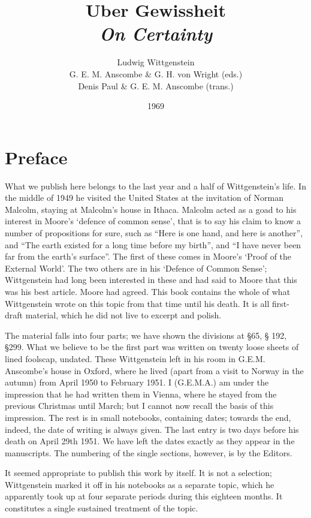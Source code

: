 \documentclass{book}
\title{Uber Gewissheit \\ \emph{On Certainty}}
\author{Ludwig Wittgenstein \vspace{12pt} \\ G. E. M. Anscombe \& G. H. von Wright (eds.) \\ Denis Paul \& G. E. M. Anscombe (trans.)}
\date{1969}
\begin{document}
\frontmatter
\maketitle

\chapter{Preface}

What we publish here belongs to the last year and a half of Wittgenstein's
life. In the middle of 1949 he visited the United States at the invitation of
Norman Malcolm, staying at Malcolm's house in Ithaca. Malcolm acted as a goad
to his interest in Moore's `defence of common sense', that is to say his claim
to know a number of propositions for sure, such as ``Here is one hand, and here
is another'', and ``The earth existed for a long time before my birth'', and
``I have never been far from the earth's surface''. The first of these comes in
Moore's `Proof of the External World'. The two others are in his `Defence of
Common Sense'; Wittgenstein had long been interested in these and had said to
Moore that this was his best article. Moore had agreed. This book contains the
whole of what Wittgenstein wrote on this topic from that time until his death.
It is all first-draft material, which he did not live to excerpt and polish.

The material falls into four parts; we have shown the divisions at \S 65, \S
192, \S 299. What we believe to be the first part was written on twenty loose
sheets of lined foolscap, undated. These Wittgenstein left in his room in
G.E.M. Anscombe's house in Oxford, where he lived (apart from a visit to Norway
in the autumn) from April 1950 to February 1951. I (G.E.M.A.) am under the
impression that he had written them in Vienna, where he stayed from the
previous Christmas until March; but I cannot now recall the basis of this
impression. The rest is in small notebooks, containing dates; towards the end,
indeed, the date of writing is always given. The last entry is two days before
his death on April 29th 1951. We have left the dates exactly as they appear in
the manuscripts. The numbering of the single sections, however, is by the
Editors.

It seemed appropriate to publish this work by itself. It is not a selection;
Wittgenstein marked it off in his notebooks as a separate topic, which he
apparently took up at four separate periods during this eighteen months. It
constitutes a single sustained treatment of the topic.
\end{document}
